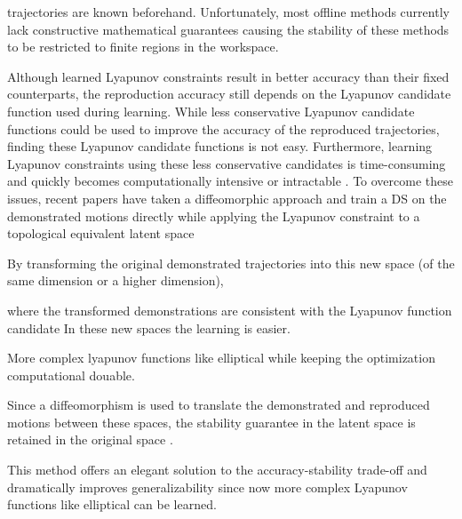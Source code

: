 trajectories are known beforehand. Unfortunately, most offline methods currently lack constructive mathematical guarantees causing the stability of these methods to be restricted to finite regions in the workspace. 

Although learned Lyapunov constraints result in better accuracy than their fixed counterparts, the reproduction accuracy still depends on the Lyapunov candidate function used during learning. While less conservative Lyapunov candidate functions could be used to improve the accuracy of the reproduced trajectories, finding these Lyapunov candidate functions is not easy. Furthermore, learning Lyapunov constraints using these less conservative candidates is time-consuming and quickly becomes computationally intensive or intractable \cite{fieldLearningTrajectoriesRobot2016}. To overcome these issues, recent papers have taken a diffeomorphic approach and train a DS on the demonstrated motions directly while applying the Lyapunov constraint to a topological equivalent latent space \cite{neumannLearningRobotMotions2015,perrinFastDiffeomorphicMatching2016,jinImprovedLearningAccuracy2019,ranaEuclideanizingFlowsDiffeomorphic2020,urainImitationFlowLearningDeep2020,saverianoLearningStableRobotic2022,urainLearningStableVector2022,wangLearningDeepRobotic2022}

By transforming the original demonstrated trajectories into this new space (of the same dimension or a higher dimension), 

where the transformed demonstrations are
consistent with the Lyapunov function candidate
In these new spaces the learning is easier.

More complex lyapunov functions like elliptical while keeping the optimization computational douable.

Since a diffeomorphism is used to translate the demonstrated and reproduced motions between these spaces, the stability guarantee in the latent space is retained in the original space \cite{leeIntroductionTopologicalManifolds2011,leeIntroductionSmoothManifolds2012,leeIntroductionRiemannianManifolds2018}. 

This method offers an elegant solution to the accuracy-stability trade-off and dramatically improves generalizability since now more complex Lyapunov functions like elliptical can be learned. 

